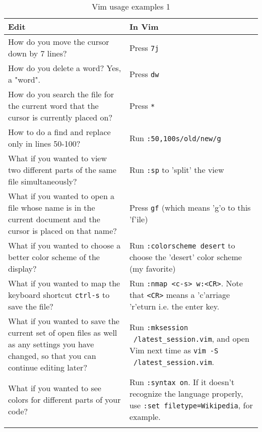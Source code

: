 \begin{table*}[H]
	\begin{tabular}{p{6cm}| p{7.5cm}}
Edit & In Vim \\ \hline
How do you move the cursor down by 7 lines? & Press \texttt{7j} \\ 
How do you delete a word? Yes, a "word". &Press \texttt{dw} \\ 
How do you search the file for the current word that the cursor is currently 
placed on? & Press \texttt{*} \\ 
How to do a find and replace only in lines 50-100? & Run 
\texttt{:50,100s/old/new/g} \\ 
What if you wanted to view two different parts of the same file simultaneously? 
& Run \texttt{:sp} to 'split' the view \\ 
What if you wanted to open a file whose name is in the current document and 
the cursor is placed on that name? & Press \texttt{gf} (which means 'g'o to 
this 'f'ile) \\
What if you wanted to choose a better color scheme of the display? & Run
\texttt{:colorscheme desert} to choose the 'desert' color scheme (my favorite)\\ 
What if you wanted to map the keyboard shortcut \texttt{ctrl-s} to save the
file? & Run \texttt{:nmap <c-s> w:<CR>}. Note that \texttt{<CR>} means a 
'c'arriage 'r'eturn i.e. the enter key. \\ 
What if you wanted to save the current set of open files as well as any settings 
you have changed, so that you can continue editing later? & Run \texttt{:mksession
~/latest\_session.vim}, and open Vim next time as 
\texttt{vim -S ~/latest\_session.vim}. \\ 
What if you wanted to see colors for different parts of your code? & Run 
\texttt{:syntax on}. If it doesn't recognize the language properly, use 
\texttt{:set filetype=Wikipedia}, for example. \\ 
	\caption{Vim usage examples 1}
	\label{tab:vimusageexample1}
\end{tabular}
\end{table*}

